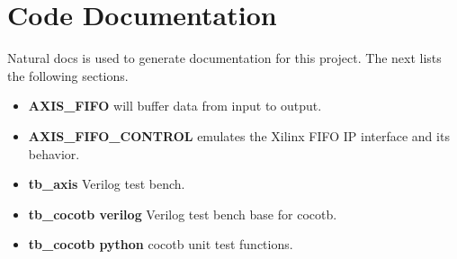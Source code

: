 \section{Code Documentation} \label{Code Documentation}

\par
Natural docs is used to generate documentation for this project. The next lists the following sections.

\begin{itemize}
\item \textbf{AXIS\_FIFO} will buffer data from input to output.\\
\item \textbf{AXIS\_FIFO\_CONTROL} emulates the Xilinx FIFO IP interface and its behavior.\\
\item \textbf{tb\_axis} Verilog test bench.\\
\item \textbf{tb\_cocotb verilog} Verilog test bench base for cocotb.\\
\item \textbf{tb\_cocotb python} cocotb unit test functions.\\
\end{itemize}

